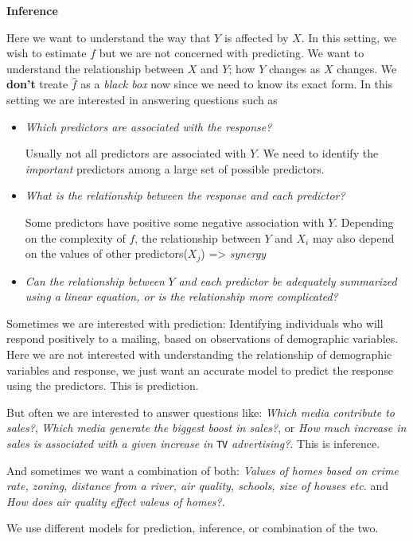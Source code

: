 \documentclass[
  letterpaper,
  DIV=11,
  numbers=noendperiod]{scrreprt}
\begin{document}
\textbf{Inference}

Here we want to understand the way that \(Y\) is affected by \(X\). In
this setting, we wish to estimate \(f\) but we are not concerned with
predicting. We want to understand the relationship between \(X\) and
\(Y\); how \(Y\) changes as \(X\) changes. We \textbf{don't} treate
\(\hat{f}\) as a \emph{black box} now since we need to know its exact
form. In this setting we are interested in answering questions such as

\begin{itemize}
\item
  \emph{Which predictors are associated with the response?}

  Usually not all predictors are associated with \(Y\). We need to
  identify the \emph{important} predictors among a large set of possible
  predictors.
\item
  \emph{What is the relationship between the response and each
  predictor?}

  Some predictors have positive some negative association with \(Y\).
  Depending on the complexity of \(f\), the relationship between \(Y\)
  and \(X_i\) may also depend on the values of other predictors(\(X_j\))
  =\textgreater{} \emph{synergy}
\item
  \emph{Can the relationship between} \(Y\) \emph{and each predictor be
  adequately summarized using a linear equation, or is the relationship
  more complicated?}
\end{itemize}

Sometimes we are interested with prediction: Identifying individuals who
will respond positively to a mailing, based on observations of
demographic variables. Here we are not interested with understanding the
relationship of demographic variables and response, we just want an
accurate model to predict the response using the predictors. This is
prediction.

But often we are interested to answer questions like: \emph{Which media
contribute to sales?}, \emph{Which media generate the biggest boost in
sales?}, or \emph{How much increase in sales is associated with a given
increase in} \texttt{TV} \emph{advertising?}. This is inference.

And sometimes we want a combination of both: \emph{Values of homes based
on crime rate, zoning, distance from a river, air quality, schools, size
of houses etc.} and \emph{How does air quality effect valeus of homes?}.

We use different models for prediction, inference, or combination of the
two.
\end{document}
